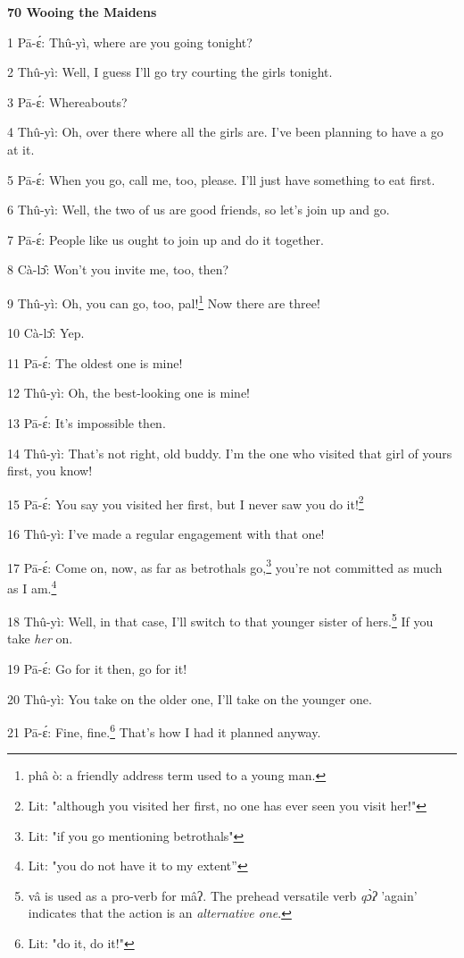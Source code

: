 
\textbf{70 Wooing the Maidens}

1 Pā-ɛ́: Thû-yì, where are you going tonight?

2 Thû-yì: Well, I guess I'll go try courting the girls tonight.

3 Pā-ɛ́: Whereabouts?

4 Thû-yì: Oh, over there where all the girls are. I've been planning to have
a go at it.

5 Pā-ɛ́: When you go, call me, too, please. I'll just have something to eat
first.

6 Thû-yì: Well, the two of us are good friends, so let's join up and go.

7 Pā-ɛ́: People like us ought to join up and do it together.

8 Cà-lɔ̂: Won't you invite me, too, then?

9 Thû-yì: Oh, you can go, too, pal!\footnote{phâ ò: a friendly address term used to a young man.} Now there are three!

10 Cà-lɔ̂: Yep.

11 Pā-ɛ́: The oldest one is mine!

12 Thû-yì: Oh, the best-looking one is mine!

13 Pā-ɛ́: It's impossible then.

14 Thû-yì: That's not right, old buddy. I'm the one who visited that girl of
yours first, you know!

15 Pā-ɛ́: You say you visited her first, but I never saw you do it!\footnote{Lit: "although you visited her first, no one has ever seen you visit her!"}

16 Thû-yì: I've made a regular engagement with that one!

17 Pā-ɛ́: Come on, now, as far as betrothals go,\footnote{Lit: "if you go mentioning betrothals"} you're not committed as
much as I am.\footnote{Lit: "you do not have it to my extent''}

18 Thû-yì: Well, in that case, I'll switch to that younger sister of hers.\footnote{vâ is used as a pro-verb for mâʔ. The prehead versatile verb \textit{qɔ̀ʔ} 'again' indicates that the action is an \textit{alternative one}.}
If you take \textit{her} on.

19 Pā-ɛ́: Go for it then, go for it!

20 Thû-yì: You take on the older one, I'll take on the younger one.

21 Pā-ɛ́: Fine, fine.\footnote{Lit: "do it, do it!"} That's how I had it planned anyway.

